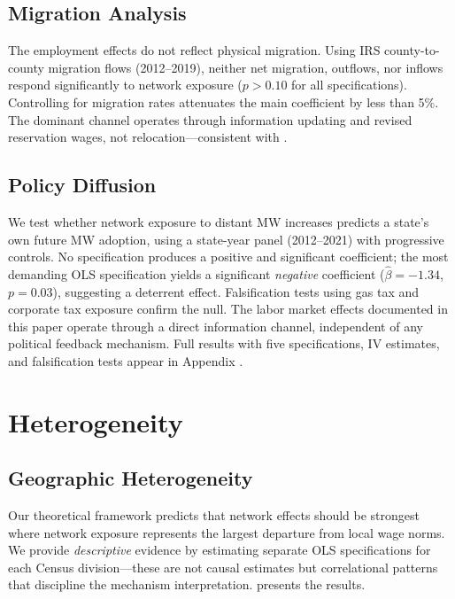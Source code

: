 \documentclass[12pt]{article}
\begin{document}
\subsection{Migration Analysis}

The employment effects do not reflect physical migration. Using IRS county-to-county migration flows (2012--2019), neither net migration, outflows, nor inflows respond significantly to network exposure ($p > 0.10$ for all specifications). Controlling for migration rates attenuates the main coefficient by less than 5\%. The dominant channel operates through information updating and revised reservation wages, not relocation---consistent with \citet{jager2024worker}.

\subsection{Policy Diffusion}

We test whether network exposure to distant MW increases predicts a state's own future MW adoption, using a state-year panel (2012--2021) with progressive controls. No specification produces a positive and significant coefficient; the most demanding OLS specification yields a significant \textit{negative} coefficient ($\hat{\beta} = -1.34$, $p = 0.03$), suggesting a deterrent effect. Falsification tests using gas tax and corporate tax exposure confirm the null. The labor market effects documented in this paper operate through a direct information channel, independent of any political feedback mechanism. Full results with five specifications, IV estimates, and falsification tests appear in Appendix .

\section{Heterogeneity}
\label{sec:heterogeneity}

\subsection{Geographic Heterogeneity}

Our theoretical framework predicts that network effects should be strongest where network exposure represents the largest departure from local wage norms. We provide \textit{descriptive} evidence by estimating separate OLS specifications for each Census division---these are not causal estimates but correlational patterns that discipline the mechanism interpretation.  presents the results.
\end{document}
